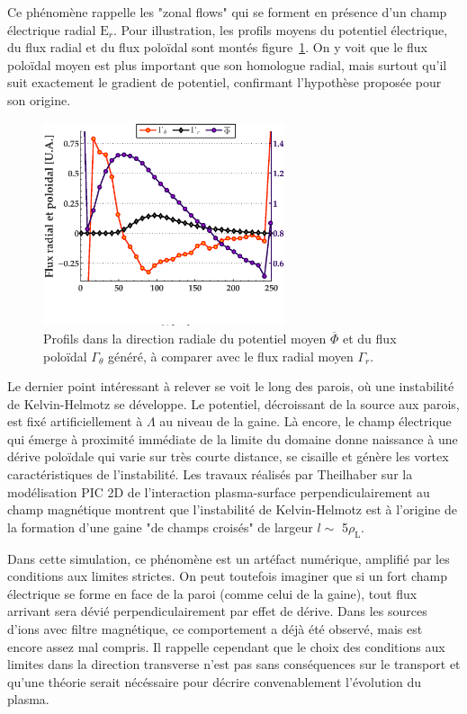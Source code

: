 \begin{refsection}
Ce phénomène rappelle les "zonal flows" qui se forment en présence
d'un champ électrique radial $\text{E}_r$. Pour illustration, les profils moyens du
potentiel électrique, du flux radial et du flux poloïdal sont montés
figure~\ref{2-profileFluxRadialWhTedNdx}. On y voit que le flux poloïdal moyen
est plus important que son homologue radial, mais surtout qu'il suit exactement
le gradient de potentiel, confirmant l'hypothèse proposée pour son origine.

	\begin{figure}[!htbp]
    \centering
    \label{2-profileFluxRadialWhTedNdx}
    \includegraphics[height=6cm]{figures/2-profileFluxWhTedNdx.eps}
    \caption{Profils dans la direction radiale du potentiel moyen
    $\overline{\Phi}$ et du flux poloïdal $\Gamma_\theta$ généré, à comparer
    avec le flux radial moyen $\Gamma_r$.}
	\end{figure}

Le dernier point intéressant à relever se voit le long des parois, où une
instabilité de Kelvin-Helmotz se développe. Le potentiel, décroissant de la
source aux parois, est fixé artificiellement à $\Lambda$ au niveau de la gaine.
Là encore, le champ électrique qui émerge à proximité immédiate de la limite du
domaine donne naissance à une dérive poloïdale qui varie sur très courte
distance, se cisaille et génère les vortex caractéristiques de l'instabilité.
Les travaux réalisés par Theilhaber sur la modélisation PIC 2D de l'interaction
plasma-surface perpendiculairement au champ magnétique
\parencite{Theilhaber} montrent que l'instabilité de Kelvin-Helmotz est à
l'origine de la formation d'une gaine "de champs croisés" de largeur $l\sim$
5$\rho_\text{L}$.

Dans cette simulation, ce phénomène est un artéfact numérique, amplifié par les
conditions aux limites strictes. On peut toutefois imaginer que si un fort
champ électrique se forme en face de la paroi (comme celui de la gaine), tout
flux arrivant sera dévié perpendiculairement par effet de dérive.
Dans les sources d'ions avec filtre magnétique, ce comportement a déjà été
observé, mais est encore assez mal compris. Il rappelle cependant que le choix
des conditions aux limites dans la direction transverse n'est pas sans
conséquences sur le transport et qu'une théorie serait nécéssaire pour décrire
convenablement l'évolution du plasma.


\end{refsection}
